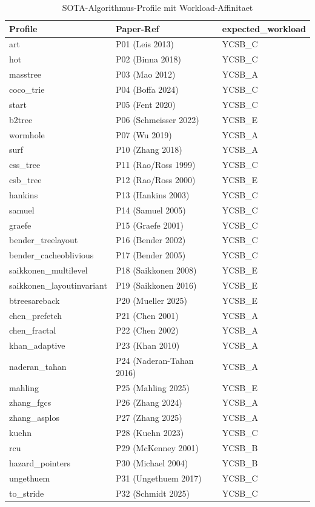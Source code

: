 \begin{table}[!htbp]
\caption{SOTA-Algorithmus-Profile mit Workload-Affinitaet}
\label{tab:sota-profiles}
\centering
\small
\begin{tabular}{|l|l|l|}
\hline
\textbf{Profile} & \textbf{Paper-Ref} & \textbf{expected\_workload} \\
\hline
art            & P01 (Leis 2013)     & YCSB\_C \\
hot            & P02 (Binna 2018)    & YCSB\_C \\
masstree       & P03 (Mao 2012)      & YCSB\_A \\
coco\_trie     & P04 (Boffa 2024)    & YCSB\_C \\
start          & P05 (Fent 2020)     & YCSB\_C \\
b2tree         & P06 (Schmeisser 2022) & YCSB\_E \\
wormhole       & P07 (Wu 2019)       & YCSB\_A \\
surf           & P10 (Zhang 2018)    & YCSB\_A \\
css\_tree      & P11 (Rao/Ross 1999) & YCSB\_C \\
csb\_tree      & P12 (Rao/Ross 2000) & YCSB\_E \\
hankins        & P13 (Hankins 2003)  & YCSB\_C \\
samuel         & P14 (Samuel 2005)   & YCSB\_C \\
graefe         & P15 (Graefe 2001)   & YCSB\_C \\
bender\_treelayout       & P16 (Bender 2002)  & YCSB\_C \\
bender\_cacheoblivious   & P17 (Bender 2005)  & YCSB\_C \\
saikkonen\_multilevel    & P18 (Saikkonen 2008) & YCSB\_E \\
saikkonen\_layoutinvariant & P19 (Saikkonen 2016) & YCSB\_E \\
btreesareback  & P20 (Mueller 2025)  & YCSB\_E \\
chen\_prefetch & P21 (Chen 2001)     & YCSB\_A \\
chen\_fractal  & P22 (Chen 2002)     & YCSB\_A \\
khan\_adaptive & P23 (Khan 2010)     & YCSB\_A \\
naderan\_tahan & P24 (Naderan-Tahan 2016) & YCSB\_A \\
mahling        & P25 (Mahling 2025)  & YCSB\_E \\
zhang\_fgcs    & P26 (Zhang 2024)    & YCSB\_A \\
zhang\_asplos  & P27 (Zhang 2025)    & YCSB\_A \\
kuehn          & P28 (Kuehn 2023)    & YCSB\_C \\
rcu            & P29 (McKenney 2001) & YCSB\_B \\
hazard\_pointers & P30 (Michael 2004) & YCSB\_B \\
ungethuem      & P31 (Ungethuem 2017) & YCSB\_C \\
to\_stride     & P32 (Schmidt 2025)  & YCSB\_C \\
\hline
\end{tabular}
\end{table}


